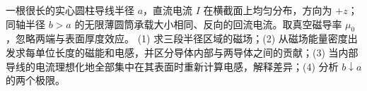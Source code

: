 一根很长的实心圆柱导线半径 \(a\)，直流电流 \(I\) 在横截面上均匀分布，方向为 \(+z\)；同轴半径 \(b>a\) 的无限薄圆筒承载大小相同、反向的回流电流。取真空磁导率 \(\mu_0\)，忽略两端与表面厚度效应。
(1) 求三段半径区域的磁场；(2) 从磁场能量密度出发求每单位长度的磁能和电感，并区分导体内部与两导体之间的贡献；(3) 当内部导线的电流理想化地全部集中在其表面时重新计算电感，解释差异；(4) 分析 \(b\downarrow a\) 的两个极限。
